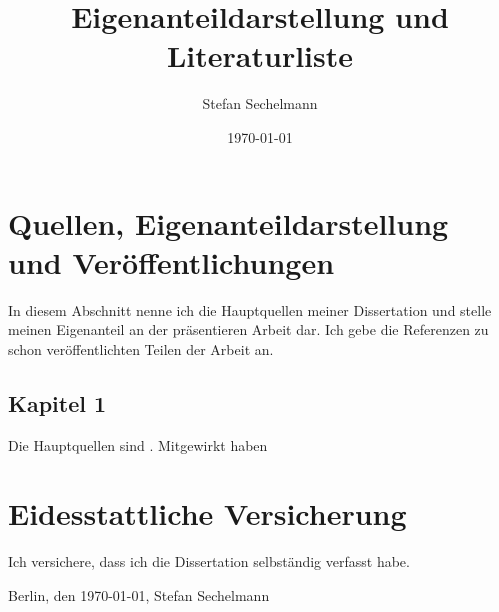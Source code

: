\documentclass[11pt]{article}
\title{Eigenanteildarstellung und Literaturliste}
\author{Stefan Sechelmann}
\date{\today}
\begin{document}
\maketitle

\section{Quellen, Eigenanteildarstellung und Ver\"{o}ffentlichungen}

In diesem Abschnitt nenne ich die Hauptquellen meiner Dissertation und stelle meinen Eigenanteil an der pr\"{a}sentieren Arbeit dar. Ich gebe die Referenzen zu schon ver\"{o}ffentlichten Teilen der Arbeit an.

\subsection*{Kapitel 1}
Die Hauptquellen sind \cite{Bobenko2010, Springborn2008}. Mitgewirkt haben 


\section{Eidesstattliche Versicherung}
Ich versichere, dass ich die Dissertation selbst\"{a}ndig verfasst habe.


\vspace{2cm}
Berlin, den \today, Stefan Sechelmann




\end{document}
